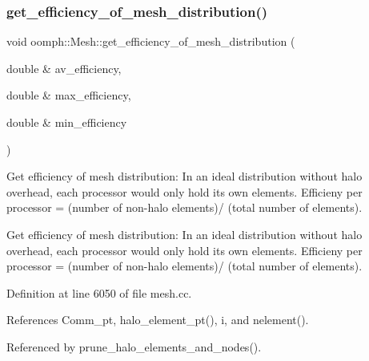 \mbox{\label{classoomph_1_1Mesh_a976ee9d35c0e10786bd3bfc86dfb34b1}} 
\subsubsection{\texorpdfstring{get\+\_\+efficiency\+\_\+of\+\_\+mesh\+\_\+distribution()}{get\_efficiency\_of\_mesh\_distribution()}}
{\footnotesize\ttfamily void oomph\+::\+Mesh\+::get\+\_\+efficiency\+\_\+of\+\_\+mesh\+\_\+distribution (\begin{DoxyParamCaption}\item[{double \&}]{av\+\_\+efficiency,  }\item[{double \&}]{max\+\_\+efficiency,  }\item[{double \&}]{min\+\_\+efficiency }\end{DoxyParamCaption})}



Get efficiency of mesh distribution\+: In an ideal distribution without halo overhead, each processor would only hold its own elements. Efficieny per processor = (number of non-\/halo elements)/ (total number of elements). 

Get efficiency of mesh distribution\+: In an ideal distribution without halo overhead, each processor would only hold its own elements. Efficieny per processor = (number of non-\/halo elements)/ (total number of elements). 

Definition at line 6050 of file mesh.\+cc.



References Comm\+\_\+pt, halo\+\_\+element\+\_\+pt(), i, and nelement().



Referenced by prune\+\_\+halo\+\_\+elements\+\_\+and\+\_\+nodes().

\mbox{\label{classoomph_1_1Mesh_a2e86b43d431e92731c7a2f522d5c2af9}} 

